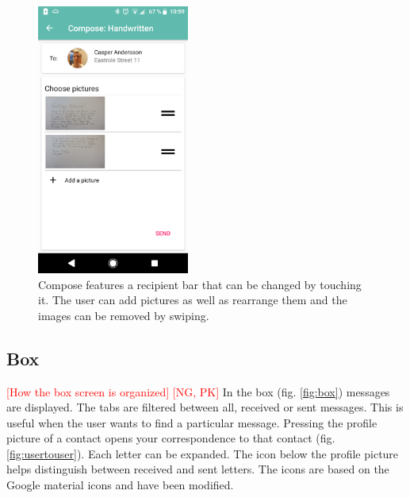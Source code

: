 \documentclass[acmlarge, review=false, screen=true]{acmart}
\begin{document}
      \begin{figure}
        \includegraphics[width=5cm]{images/composepicagain.png}
        \caption{Compose features a recipient bar that can be changed by touching it. The user can add pictures as well as rearrange them and the images can be removed by swiping.}
        \label{fig:compose}
      \end{figure}

    \subsection{Box}
      \textcolor{red}{[How the box screen is organized] [NG, PK]} \newline
      In the box (fig. \ref{fig:box}) messages are displayed. The tabs are filtered between all, received or sent messages. This is useful when the user wants to find a particular message. Pressing the profile picture of a contact opens your correspondence to that contact (fig. \ref{fig:usertouser}). Each letter can be expanded. The icon below the profile picture helps distinguish between received and sent letters. The icons are based on the Google material icons\cite{materialicons} and have been modified.
\end{document}
